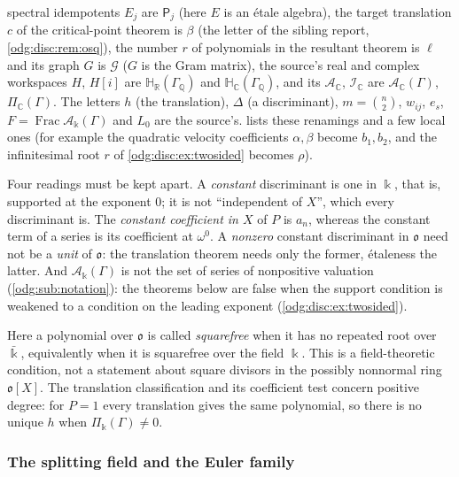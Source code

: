 \documentclass[11pt,oneside]{article}
\numberwithin{equation}{section}
\theoremstyle{definition}
\theoremstyle{remark}
\newcommand{\Q}{\mathbb Q}
\newcommand{\R}{\mathbb R}
\newcommand{\C}{\mathbb C}
\newcommand{\Frac}{\operatorname{Frac}}
\newcommand{\crA}{\mathcal A_\Bbbk(\Gamma)}
\newcommand{\crP}{\Pi_\Bbbk(\Gamma)}
\begin{document}
spectral idempotents $E_j$ are $\mathsf P_j$ (here $E$ is an \'etale algebra), the target
translation $c$ of the critical-point theorem is $\beta$ (the letter of the sibling report,
\cref{odg:disc:rem:osq}), the number $r$ of polynomials in the resultant theorem is
$\ell$ and its graph $G$ is $\mathcal G$ ($G$ is the Gram matrix), the source's real
and complex workspaces $H$, $H[i]$ are $\mathbb H_\R(\Gamma_\Q)$ and
$\mathbb H_\C(\Gamma_\Q)$, and its $\mathcal A_{\C}$, $\mathcal I_{\C}$ are
$\mathcal A_\C(\Gamma)$, $\Pi_\C(\Gamma)$. The letters $h$ (the translation), $\Delta$
(a discriminant), $m=\binom n2$, $w_{ij}$, $e_s$, $F=\Frac\crA$ and $L_0$ are the
source's.  lists these renamings and a few local ones (for
example the quadratic velocity coefficients $\alpha,\beta$ become $b_1,b_2$, and the
infinitesimal root $r$ of \cref{odg:disc:ex:twosided} becomes $\rho$).

Four readings must be kept apart. A \emph{constant} discriminant is one in $\Bbbk$, that
is, supported at the exponent $0$; it is not ``independent of $X$'', which every
discriminant is. The \emph{constant coefficient in $X$} of $P$ is $a_n$, whereas the
constant term of a series is its coefficient at $\omega^0$. A \emph{nonzero} constant
discriminant in $\mathfrak o$ need not be a \emph{unit} of $\mathfrak o$: the translation
theorem needs only the former, \'etaleness the latter. And $\crA$ is not the set of
series of nonpositive valuation (\cref{odg:sub:notation}): the theorems below are false
when the support condition is weakened to a condition on the leading exponent
(\cref{odg:disc:ex:twosided}).

Here a polynomial over $\mathfrak o$ is called \emph{squarefree} when it has no repeated
root over $\bar\Bbbk$, equivalently when it is squarefree over the field $\Bbbk$.
This is a field-theoretic condition, not a statement about square divisors in the possibly
nonnormal ring $\mathfrak o[X]$. The translation classification and its coefficient test
concern positive degree: for $P=1$ every translation gives the same polynomial, so there
is no unique $h$ when $\crP\ne0$.

\subsubsection{The splitting field and the Euler family}\label{odg:disc:sub:rings}
\end{document}
